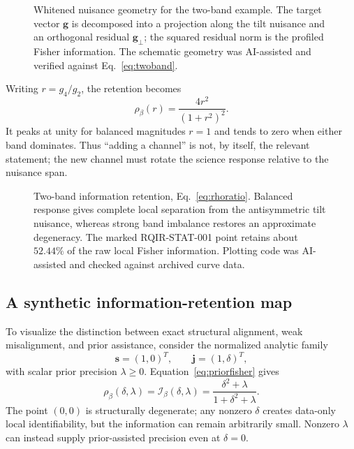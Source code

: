 \begin{figure}[t]
\centering

\caption{Whitened nuisance geometry for the two-band example. The target vector $\bm g$ is decomposed into a projection along the tilt nuisance and an orthogonal residual $\bm g_\perp$; the squared residual norm is the profiled Fisher information. The schematic geometry was AI-assisted and verified against Eq.~\eqref{eq:twoband}.}
\label{fig:geometry}
\end{figure}

Writing $r=g_4/g_2$, the retention becomes
\begin{equation}
 \rho_\beta(r)=\frac{4r^2}{(1+r^2)^2}.
\label{eq:rhoratio}
\end{equation}
It peaks at unity for balanced magnitudes $r=1$ and tends to zero when either band dominates. Thus ``adding a channel'' is not, by itself, the relevant statement; the new channel must rotate the science response relative to the nuisance span.

\begin{figure}[t]
\centering

\caption{Two-band information retention, Eq.~\eqref{eq:rhoratio}. Balanced response gives complete local separation from the antisymmetric tilt nuisance, whereas strong band imbalance restores an approximate degeneracy. The marked RQIR-STAT-001 point retains about $52.44\%$ of the raw local Fisher information. Plotting code was AI-assisted and checked against archived curve data.}
\label{fig:retention}
\end{figure}

\subsection{A synthetic information-retention map}

To visualize the distinction between exact structural alignment, weak misalignment, and prior assistance, consider the normalized analytic family
\begin{equation}
 \bm s=(1,0)^T,\qquad
 \bm j=(1,\delta)^T,
\end{equation}
with scalar prior precision $\lambda\ge0$. Equation~\eqref{eq:priorfisher} gives
\begin{equation}
 \rho_\beta(\delta,\lambda)
 =\mathcal I_\beta(\delta,\lambda)
 =\frac{\delta^2+\lambda}{1+\delta^2+\lambda}.
\label{eq:map}
\end{equation}
The point $(0,0)$ is structurally degenerate; any nonzero $\delta$ creates data-only local identifiability, but the information can remain arbitrarily small. Nonzero $\lambda$ can instead supply prior-assisted precision even at $\delta=0$.


